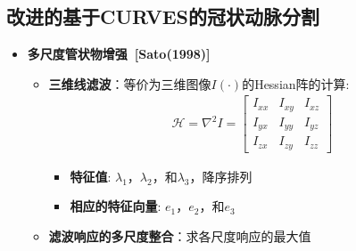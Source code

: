 \subsection[冠状动脉分割II]{改进的基于CURVES的冠状动脉分割}

\begin{frame}
\begin{itemize}
\item \textbf{多尺度管状物增强~[Sato(1998)]}
\begin{itemize}
\pause \item \textbf{三维线滤波}：等价为三维图像$I(\cdot)$的Hessian阵的计算:
\begin{gather*}
\mathcal{H} = \nabla^2 I =
\begin{bmatrix}
I_{xx} & I_{xy} & I_{xz} \\ I_{yx} & I_{yy} & I_{yz} \\ I_{zx} & I_{zy} & I_{zz}
\end{bmatrix}
\end{gather*}
\begin{itemize}
\item \textbf{特征值}: $\lambda_1$，$\lambda_2$，和$\lambda_3$，降序排列
\item \textbf{相应的特征向量}: $e_1$，$e_2$，和$e_3$
\end{itemize}
\pause \item \textbf{滤波响应的多尺度整合}：求各尺度响应的最大值
\end{itemize}
\end{itemize}
\end{frame}

